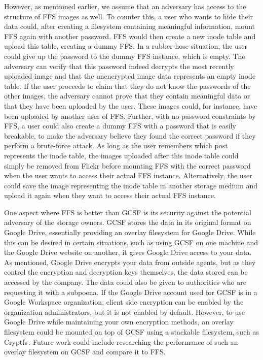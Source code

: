 However, as mentioned earlier, we assume that an adversary has access to the structure of \gls{FFS} images as well. To counter this, a user who wants to hide their data could, after creating a filesystem containing meaningful information, mount \gls{FFS} again with another password. \gls{FFS} would then create a new inode table and upload this table, creating a dummy \gls{FFS}. In a \mbox{rubber-hose} situation, the user could give up the password to the dummy \gls{FFS} instance, which is empty. The adversary can verify that this password indeed decrypts the most recently uploaded image and that the unencrypted image data represents an empty inode table. If the user proceeds to claim that they do not know the passwords of the other images, the adversary cannot prove that they contain meaningful data or that they have been uploaded by the user. These images could, for instance, have been uploaded by another user of \gls{FFS}. Further, with no password constraints by \gls{FFS}, a user could also create a dummy \gls{FFS} with a password that is easily breakable, to make the adversary believe they found the correct password if they perform a \mbox{brute-force} attack. As long as the user remembers which post represents the inode table, the images uploaded after this inode table could simply be removed from Flickr before mounting \gls{FFS} with the correct password when the user wants to access their actual \gls{FFS} instance. Alternatively, the user could save the image representing the inode table in another storage medium and upload it again when they want to access their actual \gls{FFS} instance.

One aspect where \gls{FFS} is better than \gls{GCSF} is its security against the potential adversary of the storage owners. \gls{GCSF} stores the data in its original format on Google Drive, essentially providing an overlay filesystem for Google Drive. While this can be desired in certain situations, such as using \gls{GCSF} on one machine and the Google Drive website on another, it gives Google Drive access to your data. As mentioned, Google Drive encrypts your data from outside agents, but as they control the encryption and decryption keys themselves, the data stored can be accessed by the company. The data could also be given to authorities who are requesting it with a subpoena. If the Google Drive account used for \gls{GCSF} is in a Google Workspace organization, client side encryption can be enabled by the organization administrators, but it is not enabled by default. However, to use Google Drive while maintaining your own encryption methods, an overlay filesystem could be mounted on top of \gls{GCSF} using a stackable filesystem, such as Cryptfs\,\cite{zadokCryptfsStackableVnode1998a}. Future work could include researching the performance of such an overlay filesystem on \gls{GCSF} and compare it to \gls{FFS}.

